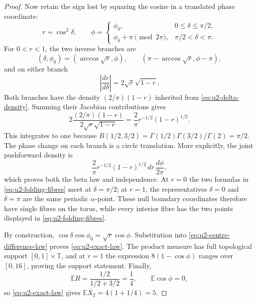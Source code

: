 \begin{proof}
Now retain the sign lost by squaring the cosine in a translated phase coordinate:
\begin{equation}
 r=\cos^2\delta,
 \qquad
 \phi=
 \begin{cases}
  \phi_0,&0\le\delta\le\pi/2,\\
  \phi_0+\pi\pmod{2\pi},&\pi/2<\delta<\pi.
 \end{cases}
 \label{eq:u2-folding-map}
\end{equation}
For $0<r<1$, the two inverse branches are
\begin{equation}
 (\delta,\phi_0)=
 \left(\arccos\sqrt r,\phi\right),
 \qquad
 \left(\pi-\arccos\sqrt r,\phi-\pi\right),
 \label{eq:u2-folding-fibres}
\end{equation}
and on either branch
\[
 \left|\frac{dr}{d\delta}\right|
 =2\sqrt r\sqrt{1-r}.
\]
Both branches have the density $(2/\pi)(1-r)$ inherited from
\eqref{eq:u2-delta-density}.  Summing their Jacobian contributions gives
\[
 2\frac{(2/\pi)(1-r)}{2\sqrt r\sqrt{1-r}}
 =\frac2\pi r^{-1/2}(1-r)^{1/2}.
\]
This integrates to one because
$B(1/2,3/2)=\Gamma(1/2)\Gamma(3/2)/\Gamma(2)=\pi/2$.  The phase change on each branch is a
circle translation.  More explicitly, the joint pushforward density is
\[
 \frac2\pi r^{-1/2}(1-r)^{1/2}\,dr\,\frac{d\phi}{2\pi},
\]
which proves both the beta law and independence.  At $r=0$ the two formulas in
\eqref{eq:u2-folding-fibres} meet at $\delta=\pi/2$; at $r=1$, the representatives
$\delta=0$ and $\delta=\pi$ are the same periodic $\alpha$-point.  These null boundary
coordinates therefore have single fibres on the torus, while every interior fibre has the
two points displayed in \eqref{eq:u2-folding-fibres}.

By construction,
$\cos\delta\cos\phi_0=\sqrt r\cos\phi$.  Substitution into
\eqref{eq:u2-centre-difference-law} proves \eqref{eq:u2-exact-law}.  The product measure has
full topological support $[0,1]\times\mathbb T$, and at $r=1$ the expression
$8(1-\cos\phi)$ ranges over $[0,16]$, proving the support statement.  Finally,
\[
 \mathbb E R=\frac{1/2}{1/2+3/2}=\frac14,
 \qquad
 \mathbb E\cos\phi=0,
\]
so \eqref{eq:u2-exact-law} gives $\mathbb E X_2=4(1+1/4)=5$.
\end{proof}

